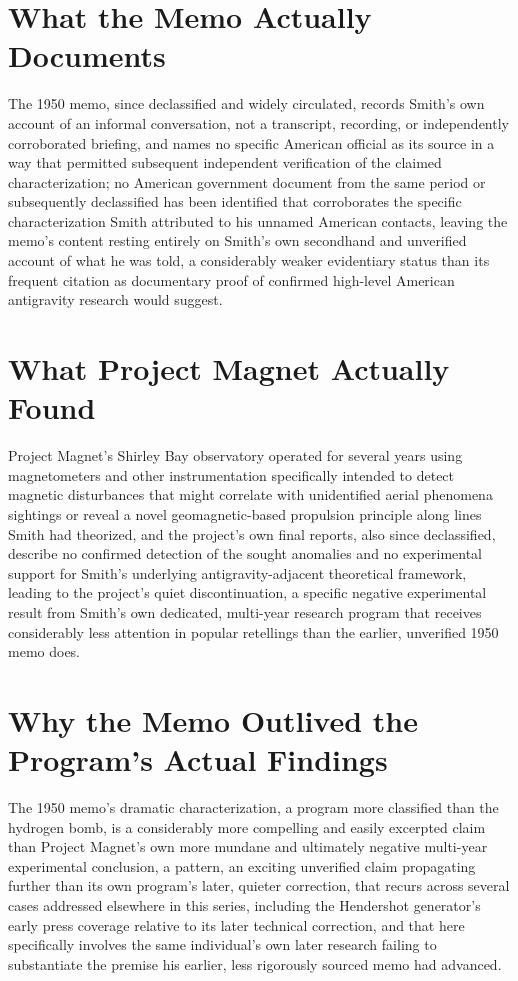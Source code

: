 \documentclass[11pt]{article}
\begin{document}
\section{What the Memo Actually Documents}

The 1950 memo, since declassified and widely circulated, records Smith's own account of an informal conversation, not a transcript, recording, or independently corroborated briefing, and names no specific American official as its source in a way that permitted subsequent independent verification of the claimed characterization; no American government document from the same period or subsequently declassified has been identified that corroborates the specific characterization Smith attributed to his unnamed American contacts, leaving the memo's content resting entirely on Smith's own secondhand and unverified account of what he was told, a considerably weaker evidentiary status than its frequent citation as documentary proof of confirmed high-level American antigravity research would suggest.

\section{What Project Magnet Actually Found}

Project Magnet's Shirley Bay observatory operated for several years using magnetometers and other instrumentation specifically intended to detect magnetic disturbances that might correlate with unidentified aerial phenomena sightings or reveal a novel geomagnetic-based propulsion principle along lines Smith had theorized, and the project's own final reports, also since declassified, describe no confirmed detection of the sought anomalies and no experimental support for Smith's underlying antigravity-adjacent theoretical framework, leading to the project's quiet discontinuation, a specific negative experimental result from Smith's own dedicated, multi-year research program that receives considerably less attention in popular retellings than the earlier, unverified 1950 memo does.

\section{Why the Memo Outlived the Program's Actual Findings}

The 1950 memo's dramatic characterization, a program more classified than the hydrogen bomb, is a considerably more compelling and easily excerpted claim than Project Magnet's own more mundane and ultimately negative multi-year experimental conclusion, a pattern, an exciting unverified claim propagating further than its own program's later, quieter correction, that recurs across several cases addressed elsewhere in this series, including the Hendershot generator's early press coverage relative to its later technical correction, and that here specifically involves the same individual's own later research failing to substantiate the premise his earlier, less rigorously sourced memo had advanced.
\end{document}
